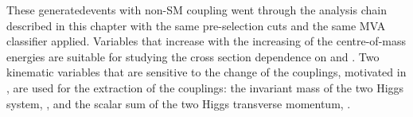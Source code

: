 These generated\eeToHH events with non-SM coupling went through the analysis chain described in this chapter with the same pre-selection cuts and the same MVA classifier applied. Variables that increase with the increasing of the centre-of-mass energies are suitable for studying the cross section dependence on \gHHH and \gWWHH. Two kinematic variables that are sensitive to the change of the couplings, motivated in , are used for the extraction of the couplings: the invariant mass of the two Higgs system, \mhh, and the scalar sum of the two Higgs transverse momentum, \HT.

